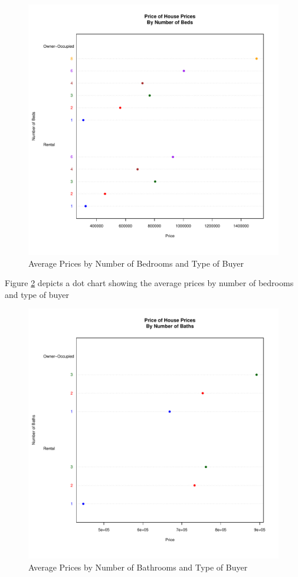 \begin{figure}[h!]
  \centering
  \includegraphics[scale = 0.5, keepaspectratio=true]{../Figures/dotchart_beds_TypeOfBuyer}
  \caption{Average Prices by Number of Bedrooms and Type of Buyer} \label{fig:dotchart_beds_TypeOfBuyer}
\end{figure}

\pagebreak
Figure \ref{fig:dotchart_baths_TypeOfBuyer} depicts a dot chart
showing the average prices by number of bedrooms and type of buyer


\begin{figure}[h!]
  \centering
  \includegraphics[scale = 0.5, keepaspectratio=true]{../Figures/dotchart_baths_TypeOfBuyer}
  \caption{Average Prices by Number of Bathrooms and Type of Buyer} \label{fig:dotchart_baths_TypeOfBuyer}
\end{figure}

